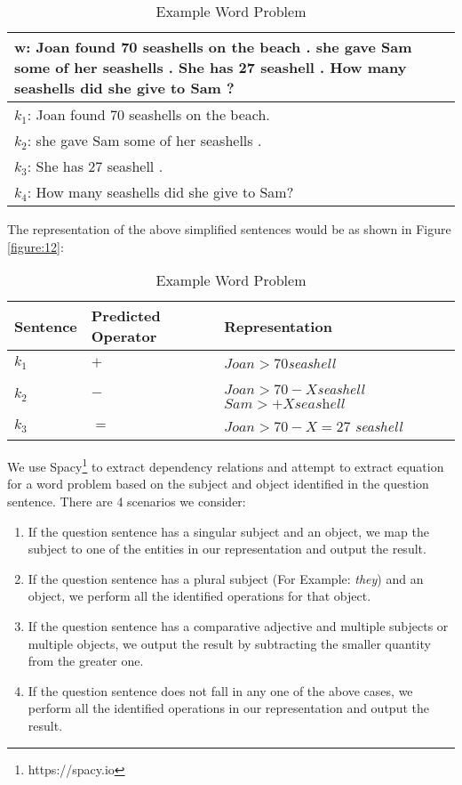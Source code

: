 \documentclass[11pt]{article}
\begin{document}
\begin{table}[h!]
\centering
\begin{tabular}{ | m{7cm} | }
\hline
 $\mathbf{w}$\textbf{: Joan found 70 seashells on the beach . she gave Sam some of her seashells . She has 27 seashell . How many seashells did she give to Sam ?}\\
\hline
$\mathit{k_{1}}$: Joan found 70 seashells on the beach.\\
\hline
$\mathit{k_{2}}$: she gave Sam some of her seashells .\\
\hline
$\mathit{k_{3}}$: She has 27 seashell .\\
\hline
$\mathit{k_{4}}$: How many seashells did she give to Sam?\\
\hline
\end{tabular}
\caption{Example Word Problem}
\label{figure:11}
\end{table}

The representation of the above simplified sentences would be as shown in Figure \ref{figure:12}:
\begin{table}[h!]
\centering
\begin{tabular}{ |p{1.3cm}|p{1.7cm}|p{3.7cm}| }
\hline
\textbf{Sentence} & \textbf{Predicted Operator} & \textbf{Representation} \\ \hline
$\mathit{k_{1}}$ & $\mathit{+}$ & $\mathit{Joan > 70}$\textit{seashell} \\ \hline
$\mathit{k_{2}}$ & $\mathit{-}$ & $\mathit{Joan> 70 - X}$\textit{seashell} $\mathit{Sam > +X}\textit{seashell}$ \\ \hline
$\mathit{k_{3}}$ & $\mathit{=}$ & $\mathit{Joan > 70 - X = 27}$ \textit{seashell}\\ \hline
\end{tabular}
\caption{Example Word Problem}
\label{figure:11}
\end{table}



We use Spacy\footnote{https://spacy.io} to extract dependency relations and attempt to extract equation for a word problem based on the subject and object identified in the question sentence. There are 4 scenarios we consider:
\begin{enumerate}[topsep=0pt,itemsep=-1ex,partopsep=1ex,parsep=1ex]
\item If the question sentence has a singular subject and an object, we map the subject to one of the entities in our representation and output the result.
\item If the question sentence has a plural subject (For Example: \textit{they}) and an object, we perform all the identified operations for that object.
\item If the question sentence has a comparative adjective and multiple subjects or multiple objects, we output the result by subtracting the smaller quantity from the greater one.
\item If the question sentence does not fall in any one of the above cases, we perform all the identified operations in our representation and output the result.
\end{enumerate}
\end{document}
